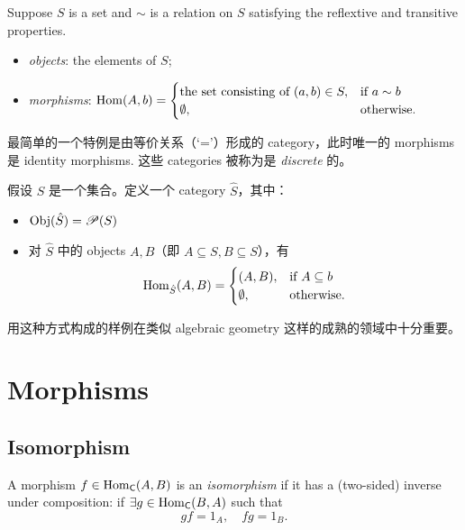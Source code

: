 \begin{eg}[Relation]\label{eg:1.3.3}
    Suppose \(S\) is a set and \(\sim\) is a relation on \(S\) satisfying the reflextive and transitive properties.
    \begin{itemize}
        \item \emph{objects}: the elements of \(S\);
        \item \emph{morphisms}: \(
              \operatorname{Hom}(A, b) = \begin{cases} \text{the set consisting of }(a, b) \in S, & \text{if } a \sim b \\ \emptyset, & \text{otherwise.} \end{cases}
              \)
    \end{itemize}
    \begin{eg}[Discrete]
        最简单的一个特例是由等价关系（`='）形成的 category，此时唯一的 morphisms 是 identity morphisms. 这些 categories 被称为是 \emph{discrete} 的。
    \end{eg}
\end{eg}

\begin{eg}\label{eg:1.3.4}
    假设 \(S\) 是一个集合。定义一个 category \(\hat{S}\)，其中：
    \begin{itemize}
        \item \(\operatorname{Obj}(\hat{S}) = \mathscr{P}(S)\)
        \item 对 \(\hat{S}\) 中的 objects \(A, B\)（即 \(A \subseteq S, B \subseteq S\)），有
              \[
                  \operatorname{Hom}_{\hat{S}}(A, B) = \begin{cases} (A, B), & \text{if } A \subseteq b \\ \emptyset, & \text{otherwise.} \end{cases}
              \]
    \end{itemize}

    \begin{remark}
        用这种方式构成的样例在类似 algebraic geometry 这样的成熟的领域中十分重要。
    \end{remark}
\end{eg}

\section{Morphisms}

\subsection{Isomorphism}
\begin{definition}[Isomorphism]\label{def:isomorphism}
    A morphism \(f \in \operatorname{Hom}_{\operatorname{\mathsf{C}}}(A, B)\) is an \emph{isomorphism} if it has a (two-sided) inverse under composition: if \(\exists g \in \operatorname{Hom}_{\operatorname{\mathsf{C}}}(B, A)\) such that
    \[
        gf = 1_A, \quad fg = 1_B.
    \]
\end{definition}